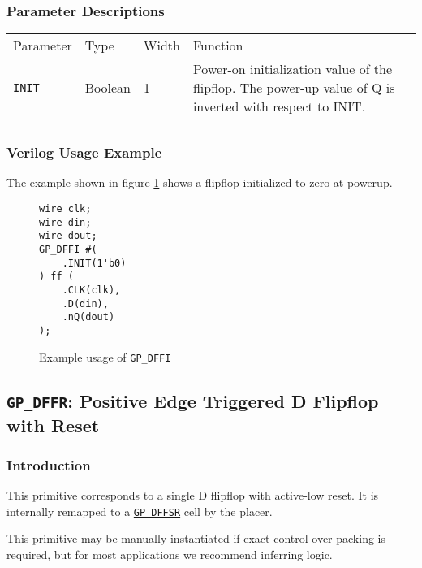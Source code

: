 \documentclass[11pt]{article}
\newcommand{\tokenstyle}[1]{\texttt{#1}}
\newcommand{\whenstyle}[1]{{\fontseries{sb}\selectfont#1}}
\newcommand{\tokenref}[2]{\hyperref[#2]{\tokenstyle{#1}}}
\newcommand{\thinhline}{\Xhline{1\arrayrulewidth}}
\newcommand{\thickhline}{\Xhline{2.5\arrayrulewidth}}
\begin{document}
\subsubsection{Parameter Descriptions}

\begin{tabularx}{\textwidth}{lllX}
\thinhline
\whenstyle{Parameter} & \whenstyle{Type} & \whenstyle{Width} & \whenstyle{Function} \\
\thickhline
\tokenstyle{INIT} & Boolean & 1 & Power-on initialization value of the flipflop. \newline The power-up value of Q is inverted 
with respect to INIT.\\
\thinhline
\end{tabularx}

\subsubsection{Verilog Usage Example}

The example shown in figure \ref{gp-dffi-example} shows a flipflop initialized to zero at powerup.

\begin{figure}[h]
\begin{lstlisting}
wire clk;
wire din;
wire dout;
GP_DFFI #(
	.INIT(1'b0)
) ff (
	.CLK(clk),
	.D(din),
	.nQ(dout)
);
\end{lstlisting}
\caption{Example usage of \tokenstyle{GP\_DFFI}}
\label{gp-dffi-example}
\end{figure}


\pagebreak
\subsection{\tokenstyle{GP\_DFFR}: Positive Edge Triggered D Flipflop with Reset}
\label{gp-dffr}

\subsubsection{Introduction}
This primitive corresponds to a single D flipflop with active-low reset. It is internally remapped to a
\tokenref{GP\_DFFSR}{gp-dffsr} cell by the placer.

This primitive may be manually instantiated if exact control over packing is required, but for most applications we
recommend inferring logic.
\end{document}
